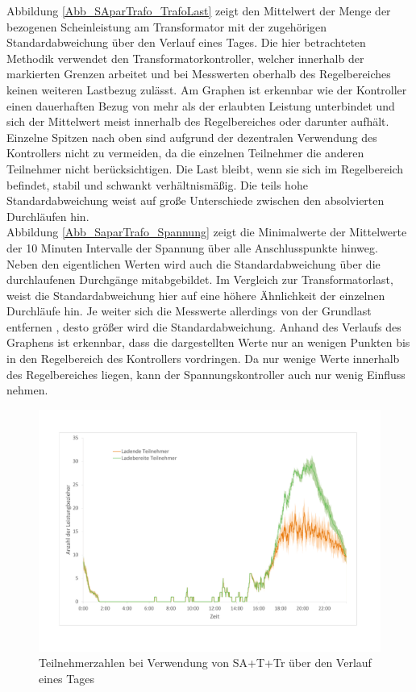 Abbildung \ref{Abb_SAparTrafo_TrafoLast} zeigt den Mittelwert der Menge der bezogenen Scheinleistung am Transformator mit der zugehörigen Standardabweichung über den Verlauf eines Tages. Die hier betrachteten Methodik verwendet den Transformatorkontroller, welcher innerhalb der markierten Grenzen arbeitet und bei Messwerten oberhalb des Regelbereiches keinen weiteren Lastbezug zulässt. Am Graphen ist erkennbar wie der Kontroller einen dauerhaften Bezug von mehr als der erlaubten Leistung unterbindet und sich der Mittelwert meist innerhalb des Regelbereiches oder darunter aufhält. Einzelne Spitzen nach oben sind aufgrund der dezentralen Verwendung des Kontrollers nicht zu vermeiden, da die einzelnen Teilnehmer die anderen Teilnehmer nicht berücksichtigen. Die Last bleibt, wenn sie sich im Regelbereich befindet, stabil und schwankt verhältnismäßig. Die teils hohe Standardabweichung weist auf große Unterschiede zwischen den absolvierten Durchläufen hin.  \\
Abbildung \ref{Abb_SaparTrafo_Spannung} zeigt die Minimalwerte der Mittelwerte der 10 Minuten Intervalle der Spannung über alle Anschlusspunkte hinweg. Neben den eigentlichen Werten wird auch die Standardabweichung über die durchlaufenen Durchgänge mitabgebildet. Im Vergleich zur Transformatorlast, weist die Standardabweichung hier auf eine höhere Ähnlichkeit der einzelnen Durchläufe hin. Je weiter sich die Messwerte allerdings von der Grundlast entfernen , desto größer wird die Standardabweichung. Anhand des Verlaufs des Graphens ist erkennbar, dass die dargestellten Werte nur an wenigen Punkten bis in den Regelbereich des Kontrollers vordringen. Da nur wenige Werte innerhalb des Regelbereiches liegen, kann der Spannungskontroller auch nur wenig Einfluss nehmen.\\
\begin{figure}[htb]
\centering
	\includegraphics[scale=0.45]{img/SA_par_trafo/Teilnehmer4.pdf}
	\caption{Teilnehmerzahlen bei Verwendung von SA+T+Tr über den Verlauf eines Tages}
	\label{Abb_SAparTrafo_Teilnehmer}
\end{figure}

